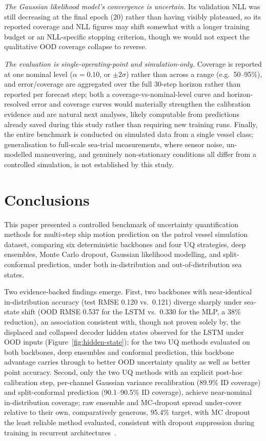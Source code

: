 \documentclass[a4paper,fleqn]{cas-sc}
\begin{document}
\emph{The Gaussian likelihood model's convergence is uncertain.} Its validation NLL was still decreasing at the final epoch (20) rather than having visibly plateaued, so its reported coverage and NLL figures may shift somewhat with a longer training budget or an NLL-specific stopping criterion, though we would not expect the qualitative OOD coverage collapse to reverse.

\emph{The evaluation is single-operating-point and simulation-only.} Coverage is reported at one nominal level ($\alpha=0.10$, or $\pm2\sigma$) rather than across a range (e.g.\ 50--95\%), and error/coverage are aggregated over the full 30-step horizon rather than reported per forecast step; both a coverage-vs-nominal-level curve and horizon-resolved error and coverage curves would materially strengthen the calibration evidence and are natural next analyses, likely computable from predictions already saved during this study rather than requiring new training runs. Finally, the entire benchmark is conducted on simulated data from a single vessel class; generalisation to full-scale sea-trial measurements, where sensor noise, un-modelled maneuvering, and genuinely non-stationary conditions all differ from a controlled simulation, is not established by this study.

\section{Conclusions}

This paper presented a controlled benchmark of uncertainty quantification methods for multi-step ship motion prediction on the patrol vessel simulation dataset, comparing six deterministic backbones and four UQ strategies, deep ensembles, Monte Carlo dropout, Gaussian likelihood modelling, and split-conformal prediction, under both in-distribution and out-of-distribution sea states.

Two evidence-backed findings emerge. First, two backbones with near-identical in-distribution accuracy (test RMSE 0.120 vs.\ 0.121) diverge sharply under sea-state shift (OOD RMSE 0.537 for the LSTM vs.\ 0.330 for the MLP, a 38\% reduction), an association consistent with, though not proven solely by, the displaced and collapsed decoder hidden states observed for the LSTM under OOD inputs (Figure~\ref{fig:hidden-state}); for the two UQ methods evaluated on both backbones, deep ensembles and conformal prediction, this backbone advantage carries through to better OOD uncertainty quality as well as better point accuracy. Second, only the two UQ methods with an explicit post-hoc calibration step, per-channel Gaussian variance recalibration (89.9\% ID coverage) and split-conformal prediction (90.1--90.5\% ID coverage), achieve near-nominal in-distribution coverage; raw ensemble and MC-dropout spread under-cover relative to their own, comparatively generous, 95.4\% target, with MC dropout the least reliable method evaluated, consistent with dropout suppression during training in recurrent architectures~\cite{gal2016dropout, foldesi2023comparison}.
\end{document}
